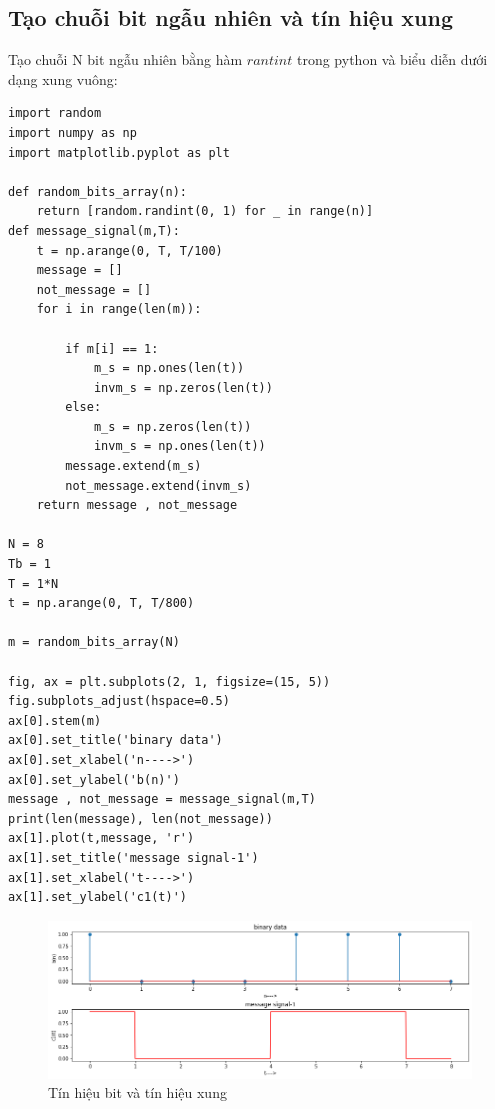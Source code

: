 \subsection{Tạo chuỗi bit ngẫu nhiên và tín hiệu xung}
Tạo chuỗi N bit ngẫu nhiên bằng hàm $rantint$ trong python và biểu diễn dưới dạng xung vuông:

\begin{lstlisting}
import random
import numpy as np
import matplotlib.pyplot as plt

def random_bits_array(n):   
    return [random.randint(0, 1) for _ in range(n)]
def message_signal(m,T):  
    t = np.arange(0, T, T/100)
    message = []
    not_message = []
    for i in range(len(m)):
        
        if m[i] == 1:
            m_s = np.ones(len(t))
            invm_s = np.zeros(len(t))
        else:
            m_s = np.zeros(len(t))
            invm_s = np.ones(len(t))
        message.extend(m_s)
        not_message.extend(invm_s)
    return message , not_message
           
N = 8       
Tb = 1       
T = 1*N    
t = np.arange(0, T, T/800)

m = random_bits_array(N)

fig, ax = plt.subplots(2, 1, figsize=(15, 5))
fig.subplots_adjust(hspace=0.5)
ax[0].stem(m)
ax[0].set_title('binary data')
ax[0].set_xlabel('n---->')
ax[0].set_ylabel('b(n)')
message , not_message = message_signal(m,T)
print(len(message), len(not_message))
ax[1].plot(t,message, 'r')
ax[1].set_title('message signal-1')
ax[1].set_xlabel('t---->')
ax[1].set_ylabel('c1(t)')

\end{lstlisting}


\begin{center}
    \begin{figure}[htp]
    \begin{center}
     \includegraphics[scale=.5]{Img/binary_signal.png}
    \end{center}
    \caption{Tín hiệu bit và tín hiệu xung}
    \label{refhinh1}
    \end{figure}
\end{center}

